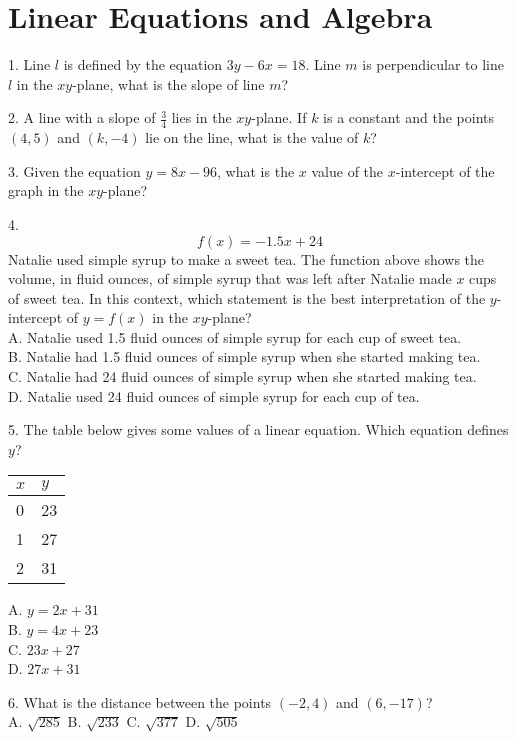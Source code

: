 \documentclass[../satmath.tex]{subfiles}
\begin{document}
\chapter{Linear Equations and Algebra}
1. Line $l$ is defined by the equation $3y-6x=18$. Line $m$ is perpendicular to line $l$ in the $xy$-plane, what is the slope of line $m$?
\medbreak

2. A line with a slope of $\frac{3}{4}$ lies in the $xy$-plane. If $k$ is a constant and the points $(4,5)$ and $(k,-4)$ lie on the line, 
what is the value of $k$?
\medbreak

3. Given the equation $y=8x-96$, what is the $x$ value of the $x$-intercept of the graph in the $xy$-plane?
\medbreak

4.
\[f(x)=-1.5x+24\]
Natalie used simple syrup to make a sweet tea. The function above shows the volume, in fluid ounces, of simple syrup that was left after Natalie 
made $x$ cups of sweet tea. In this context, which statement is the best interpretation of the $y$-intercept of $y=f(x)$ in the $xy$-plane?\\
A. Natalie used 1.5 fluid ounces of simple syrup for each cup of sweet tea.\\
B. Natalie had 1.5 fluid ounces of simple syrup when she started making tea.\\
C. Natalie had 24 fluid ounces of simple syrup when she started making tea.\\
D. Natalie used 24 fluid ounces of simple syrup for each cup of tea.
\medbreak

5. The table below gives some values of a linear equation. Which equation defines $y$?
\begin{table}[h]
    \centering
    \begin{tabular}{|l|l|}
    \hline
    $x$ & $y$ \\ \hline
    0 & 23 \\ \hline
    1 & 27 \\ \hline
    2 & 31 \\ \hline
    \end{tabular}
\end{table}

A. $y=2x+31$\\
B. $y=4x+23$\\
C. $23x+27$\\
D. $27x+31$
\medbreak

6. What is the distance between the points $(-2,4)$ and $(6,-17)$?\\
A. $\sqrt{285}$ \quad B. $\sqrt{233}$ \quad C. $\sqrt{377}$ \quad D. $\sqrt{505}$
\medbreak
\end{document}
